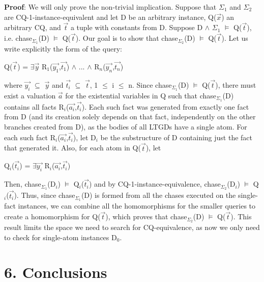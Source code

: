 \documentclass[11pt, a4paper, dvipsnames]{article}
\begin{document}
\textbf{Proof}: We will only prove the non-trivial implication. Suppose that $\Sigma_{1}$ and $\Sigma_{2}$ are CQ-1-instance-equivalent and let D be an arbitrary instance, Q($\vec{x}$) an arbitrary CQ, and $\vec{t}$ a tuple with constants from D. Suppose D $\wedge$ $\Sigma_{1}$ $\vDash$ Q($\vec{t}$), i.e. chase$_{\Sigma_{1}}$(D) $\vDash$ Q($\vec{t}$). Our goal is to show that chase$_{\Sigma_{2}}$(D) $\vDash$ Q($\vec{t}$). Let us write explicitly the form of the query:
\begin{center}
Q($\vec{t}$) = $\exists \vec{y}$ R$_{1}$($\vec{y_{1}}$,$\vec{t_{1}}$) $\wedge$ ... $\wedge$ R$_{n}$($\vec{y_{n}}$,$\vec{t_{n}}$)
\end{center}
where $\vec{y_{i}}$ $\subseteq$ $\vec{y}$ and $\vec{t_{i}}$ $\subseteq$ $\vec{t}$, 1 $\leq$ i $\leq$ n. Since chase$_{\Sigma_{1}}$(D) $\vDash$ Q($\vec{t}$), there must exist a valuation $\vec{a}$ for the existential variables in Q such that chase$_{\Sigma_{1}}$(D) contains all facts R$_{i}$($\vec{a_{i}}$,$\vec{t_{i}}$). Each such fact was generated from exactly one fact from D (and its creation solely depends on that fact, independently on the other branches created from D), as the bodies of all LTGDs have a single atom. For each such fact R$_{i}$($\vec{a_{i}}$,$\vec{t_{i}}$), let D$_{i}$ be the substructure of D containing just the fact that generated it. Also, for each atom in Q($\vec{t}$), let 
\begin{center}
Q$_{i}$($\vec{t_{i}}$) = $\exists \vec{y_{i}}$ R$_{i}$($\vec{a_{i}}$,$\vec{t_{i}}$)
\end{center}
Then, chase$_{\Sigma_{1}}$(D$_{i}$) $\vDash$ Q$_{i}$($\vec{t_{i}}$) and by CQ-1-instance-equivalence, chase$_{\Sigma_{2}}$(D$_{i}$) $\vDash$ Q$_{i}$($\vec{t_{i}}$). Thus, since chase$_{\Sigma_{1}}$(D) is formed from all the chases executed on the single-fact instances, we can combine all the homomorphisms for the smaller queries to create a homomorphism for Q($\vec{t}$), which proves that chase$_{\Sigma_{2}}$(D) $\vDash$ Q($\vec{t}$).\newline
This result limits the space we need to search for CQ-equivalence, as now we only need to check for single-atom instances D$_{0}$.

\newpage

\section{6. Conclusions}
\end{document}
